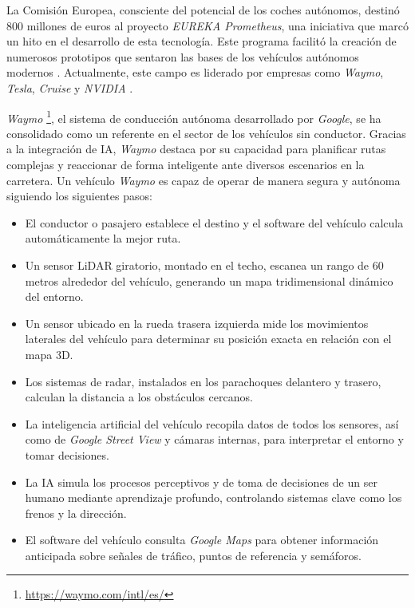 La Comisión Europea, consciente del potencial de los coches autónomos, destinó 800 millones de euros al proyecto  \textit{EUREKA Prometheus}, una iniciativa que marcó un hito en el desarrollo de esta tecnología. Este programa facilitó la creación de numerosos prototipos que sentaron las bases de los vehículos autónomos modernos  \cite{history-vehicles}. Actualmente, este campo es liderado por empresas como \textit{Waymo}, \textit{Tesla}, \textit{Cruise} y \textit{NVIDIA } \cite{ai-self-driving-cars}.

\textit{Waymo} \footnote{\url{https://waymo.com/intl/es/}}, el sistema de conducción autónoma desarrollado por \textit{Google}, se ha consolidado como un referente en el sector de los vehículos sin conductor. Gracias a la integración de \ac{IA}, \textit{Waymo} destaca por su capacidad para planificar rutas complejas y reaccionar de forma inteligente ante diversos escenarios en la carretera. Un vehículo \textit{Waymo} es capaz de operar de manera segura y autónoma siguiendo los siguientes pasos:

\begin{itemize}
    \item El conductor o pasajero establece el destino y el software del vehículo calcula automáticamente la mejor ruta.
    \item Un sensor \ac{LiDAR} giratorio, montado en el techo, escanea un rango de 60 metros alrededor del vehículo, generando un mapa tridimensional dinámico del entorno.
    \item Un sensor ubicado en la rueda trasera izquierda mide los movimientos laterales del vehículo para determinar su posición exacta en relación con el mapa 3D.
    \item Los sistemas de radar, instalados en los parachoques delantero y trasero, calculan la distancia a los obstáculos cercanos.
    \item La inteligencia artificial del vehículo recopila datos de todos los sensores, así como de \textit{Google Street View} y cámaras internas, para interpretar el entorno y tomar decisiones.
    \item La \ac{IA} simula los procesos perceptivos y de toma de decisiones de un ser humano mediante aprendizaje profundo, controlando sistemas clave como los frenos y la dirección.
    \item El software del vehículo consulta \textit{Google Maps} para obtener información anticipada sobre señales de tráfico, puntos de referencia y semáforos.
\end{itemize}

